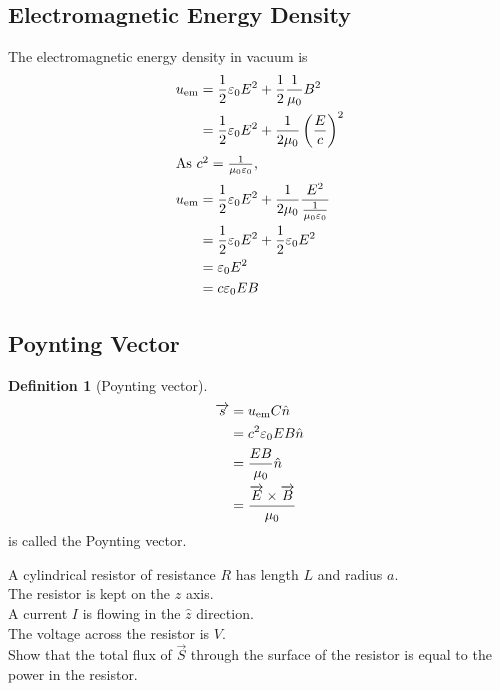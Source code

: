 \documentclass[fleqn, a4paper, 12pt, twoside]{article}
\theoremstyle{definition}
\newtheorem{definition}{Definition}
\theoremstyle{theorem}
\begin{document}
\subsection{Electromagnetic Energy Density}

The electromagnetic energy density in vacuum is
\begin{align*}
	u_{\textnormal{em}} &= \frac{1}{2} \varepsilon_0 E^2 + \frac{1}{2} \frac{1}{\mu_0} B^2\\
	&= \frac{1}{2} \varepsilon_0 E^2 + \frac{1}{2 \mu_0} \left( \frac{E}{c} \right)^2\\
	\intertext{As $c^2 = \frac{1}{\mu_0 \varepsilon_0}$,}
	u_{\textnormal{em}} &= \frac{1}{2} \varepsilon_0 E^2 + \frac{1}{2 \mu_0} \frac{E^2}{\frac{1}{\mu_0 \varepsilon_0}}\\
	&= \frac{1}{2} \varepsilon_0 E^2 + \frac{1}{2} \varepsilon_0 E^2\\
	&= \varepsilon_0 E^2\\
	&= c \varepsilon_0 E B
\end{align*}

\subsection{Poynting Vector}

\begin{definition}[Poynting vector]
	\begin{align*}
		\overrightarrow{s} &= u_{\textnormal{em}} C \hat{n}\\
		&= c^2 \varepsilon_0 E B \hat{n} \\
		&= \frac{E B}{\mu_0} \hat{n}\\
		&= \frac{\overrightarrow{E} \times \overrightarrow{B}}{\mu_0}
	\end{align*}
	is called the Poynting vector.
\end{definition}

\begin{question}
	A cylindrical resistor of resistance $R$ has length $L$ and radius $a$.\\
	The resistor is kept on the $z$ axis.\\
	A current $I$ is flowing in the $\hat{z}$ direction.\\
	The voltage across the resistor is $V$.\\
	Show that the total flux of $\overrightarrow{S}$ through the surface of the resistor is equal to the power in the resistor.
\end{question}
\end{document}
